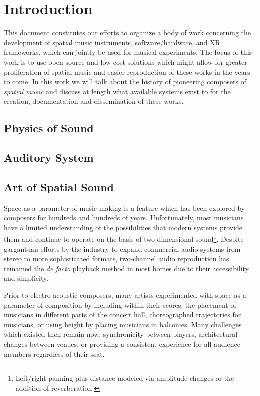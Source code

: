 \chapter{Introduction}

This document constitutes our efforts to organize a body of work concerning the development of spatial music instruments, software/hardware, and XR frameworks, which can jointly be used for musical experiments. The focus of this work is to use open source and low-cost solutions which might allow for greater proliferation of spatial music and easier reproduction of these works in the years to come. In this work we will talk about the history of pioneering composers of \textit{spatial music} and discuss at length what available systems exist to for the creation, documentation and dissemination of these works.

\section{Physics of Sound}

\section{Auditory System}

\section{Art of Spatial Sound}

Space as a parameter of music-making is a feature which has been explored by composers for hundreds and hundreds of years. Unfortunately, most musicians have a limited understanding of the possibilities that modern systems provide them and continue to operate on the basis of two-dimensional sound\footnote{Left/right panning plus distance modeled via amplitude changes or the addition of reverberation.}. Despite gargantuan efforts by the industry to expand commercial audio systems from stereo to more sophisticated formats, two-channel audio reproduction has remained the \textit{de facto} playback method in most homes due to their accessibility and simplicity. 

Prior to electro-acoustic composers, many artists experimented with space as a parameter of composition by including within their scores: the placement of musicians in different parts of the concert hall, choreographed trajectories for musicians, or using height by placing musicians in balconies. Many challenges which existed then remain now: synchronicity between players, architectural changes between venues, or providing a consistent experience for all audience members regardless of their seat.

